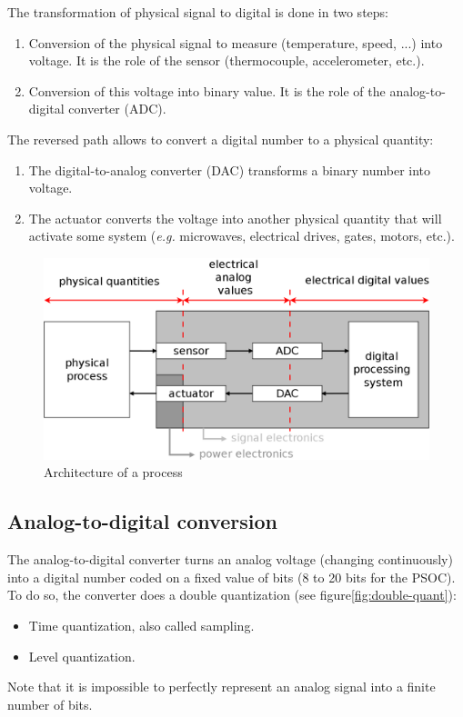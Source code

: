 \documentclass[11pt,a4paper]{article}
\theoremstyle{definition}%
\begin{document}
The transformation of physical signal to digital is done in two steps:
\begin{enumerate}
	\item Conversion of the physical signal to measure (temperature, speed, ...) into voltage. It is the role of the sensor (thermocouple, accelerometer, etc.).
	\item Conversion of this voltage into binary value. It is the role of the analog-to-digital converter (ADC).
\end{enumerate}

The reversed path allows to convert a digital number to a physical quantity:
\begin{enumerate}
	\item The digital-to-analog converter (DAC) transforms a binary number into voltage.
	\item The actuator converts the voltage into another physical quantity that will activate some system (\textit{e.g.} microwaves, electrical drives, gates, motors, etc.).
\end{enumerate}

\begin{figure}[H]
	\includegraphics[width=\textwidth]{ENarch-processus}
	\caption{Architecture of a process}
	\label{fig:arch-processus}
\end{figure}

\subsection{Analog-to-digital conversion}
The analog-to-digital converter turns an analog voltage (changing continuously) into a digital number coded on a fixed value of bits (8 to 20 bits for the PSOC).
To do so, the converter does a double quantization (see figure\ref{fig:double-quant}):
\begin{itemize}
	\item Time quantization, also called sampling.
	\item Level quantization.
\end{itemize}
Note that it is impossible to perfectly represent an analog signal into a finite number of bits.
\end{document}
